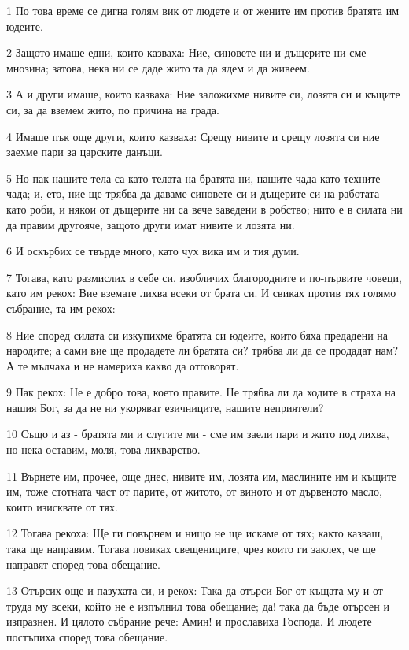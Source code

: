 \par 1 По това време се дигна голям вик от людете и от жените им против братята им юдеите.
\par 2 Защото имаше едни, които казваха: Ние, синовете ни и дъщерите ни сме мнозина; затова, нека ни се даде жито та да ядем и да живеем.
\par 3 А и други имаше, които казваха: Ние заложихме нивите си, лозята си и къщите си, за да вземем жито, по причина на града.
\par 4 Имаше пък още други, които казваха: Срещу нивите и срещу лозята си ние заехме пари за царските данъци.
\par 5 Но пак нашите тела са като телата на братята ни, нашите чада като техните чада; и, ето, ние ще трябва да даваме синовете си и дъщерите си на работата като роби, и някои от дъщерите ни са вече заведени в робство; нито е в силата ни да правим другояче, защото други имат нивите и лозята ни.
\par 6 И оскърбих се твърде много, като чух вика им и тия думи.
\par 7 Тогава, като размислих в себе си, изобличих благородните и по-първите човеци, като им рекох: Вие вземате лихва всеки от брата си. И свиках против тях голямо събрание, та им рекох:
\par 8 Ние според силата си изкупихме братята си юдеите, които бяха предадени на народите; а сами вие ще продадете ли братята си? трябва ли да се продадат нам? А те мълчаха и не намериха какво да отговорят.
\par 9 Пак рекох: Не е добро това, което правите. Не трябва ли да ходите в страха на нашия Бог, за да не ни укоряват езичниците, нашите неприятели?
\par 10 Също и аз - братята ми и слугите ми - сме им заели пари и жито под лихва, но нека оставим, моля, това лихварство.
\par 11 Върнете им, прочее, още днес, нивите им, лозята им, маслините им и къщите им, тоже стотната част от парите, от житото, от виното и от дървеното масло, които изисквате от тях.
\par 12 Тогава рекоха: Ще ги повърнем и нищо не ще искаме от тях; както казваш, така ще направим. Тогава повиках свещениците, чрез които ги заклех, че ще направят според това обещание.
\par 13 Отърсих още и пазухата си, и рекох: Така да отърси Бог от къщата му и от труда му всеки, който не е изпълнил това обещание; да! така да бъде отърсен и изпразнен. И цялото събрание рече: Амин! и прославиха Господа. И людете постъпиха според това обещание.
